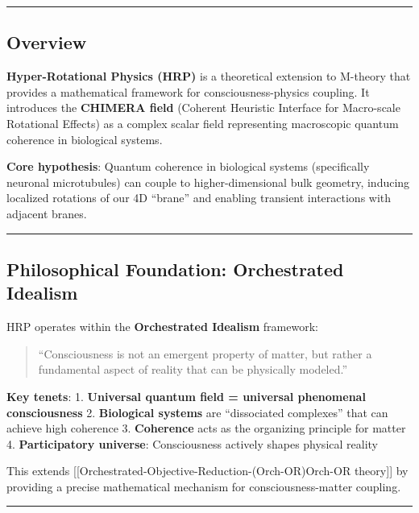 \begin{center}\rule{0.5\linewidth}{0.5pt}\end{center}

\subsection{Overview}\label{overview}

\textbf{Hyper-Rotational Physics (HRP)} is a theoretical extension to
M-theory that provides a mathematical framework for
consciousness-physics coupling. It introduces the \textbf{CHIMERA field}
(Coherent Heuristic Interface for Macro-scale Rotational Effects) as a
complex scalar field representing macroscopic quantum coherence in
biological systems.

\textbf{Core hypothesis}: Quantum coherence in biological systems
(specifically neuronal microtubules) can couple to higher-dimensional
bulk geometry, inducing localized rotations of our 4D ``brane'' and
enabling transient interactions with adjacent branes.

\begin{center}\rule{0.5\linewidth}{0.5pt}\end{center}

\subsection{Philosophical Foundation: Orchestrated
Idealism}\label{philosophical-foundation-orchestrated-idealism}

HRP operates within the \textbf{Orchestrated Idealism} framework:

\begin{quote}
``Consciousness is not an emergent property of matter, but rather a
fundamental aspect of reality that can be physically modeled.''
\end{quote}

\textbf{Key tenets}: 1. \textbf{Universal quantum field = universal
phenomenal consciousness} 2. \textbf{Biological systems} are
``dissociated complexes'' that can achieve high coherence 3.
\textbf{Coherence} acts as the organizing principle for matter 4.
\textbf{Participatory universe}: Consciousness actively shapes physical
reality

This extends
{[}{[}Orchestrated-Objective-Reduction-(Orch-OR)\textbar Orch-OR
theory{]}{]} by providing a precise mathematical mechanism for
consciousness-matter coupling.

\begin{center}\rule{0.5\linewidth}{0.5pt}\end{center}

